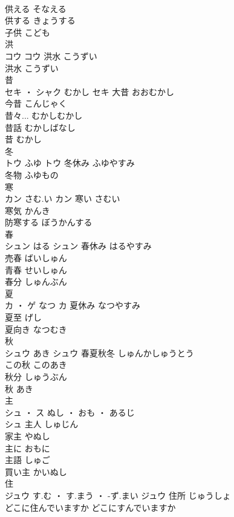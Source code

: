 \documentclass[8pt]{extreport}
\begin{document}
\begin{CJK}{UTF8}{min}
\\	供える	そなえる	
\\	供する	きょうする	
\\	子供	こども	
\\	洪	
\\	コウ		コウ	洪水	こうずい	
\\	洪水	こうずい	
\\	昔	
\\	セキ ・ シャク	むかし	セキ	大昔	おおむかし	
\\	今昔	こんじゃく	
\\	昔々...	むかしむかし	
\\	昔話	むかしばなし	
\\	昔	むかし	
\\	冬	
\\	トウ	ふゆ	トウ	冬休み	ふゆやすみ	
\\	冬物	ふゆもの	
\\	寒	
\\	カン	さむ.い	カン	寒い	さむい	
\\	寒気	かんき	
\\	防寒する	ぼうかんする	
\\	春	
\\	シュン	はる	シュン	春休み	はるやすみ	
\\	売春	ばいしゅん	
\\	青春	せいしゅん	
\\	春分	しゅんぶん	
\\	夏	
\\	カ ・ ゲ	なつ	カ	夏休み	なつやすみ	
\\	夏至	げし	
\\	夏向き	なつむき	
\\	秋	
\\	シュウ	あき	シュウ	春夏秋冬	しゅんかしゅうとう	
\\	この秋	このあき	
\\	秋分	しゅうぶん	
\\	秋	あき	
\\	主	
\\	シュ ・ ス	ぬし ・ おも ・ あるじ
\\	シュ	主人	しゅじん	
\\	家主	やぬし	
\\	主に	おもに	
\\	主語	しゅご	
\\	買い主	かいぬし	
\\	住	
\\	ジュウ	す.む ・ す.まう ・ -ず.まい	ジュウ	住所	じゅうしょ	
\\	どこに住んでいますか	どこにすんでいますか	

\end{CJK}
\end{document}
